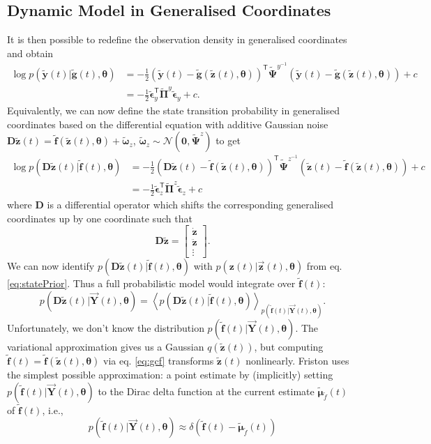 \documentclass[a4paper,10pt]{article}
\newcommand{\bs}[1]{\mathbf{#1}}					%
\newcommand{\bgs}[1]{\boldsymbol{#1}}				%
\newcommand{\tr}{\mathsf{T}}				%
\newcommand{\eq}[1]{\begin{equation} #1 \end{equation}}%
\newcommand{\gc}[1]{\tilde{#1}} %
\renewcommand{\ss}{z}         %
\newcommand{\so}{y}         %
\newcommand{\spe}{\epsilon} %
\renewcommand{\sp}{\theta}    %
\newcommand{\ps}{\bs{\ss}}    %
\newcommand{\po}{\bs{\so}}    %
\newcommand{\ppe}{\bgs{\spe}} %
\newcommand{\psg}{\gc{\ps}}    %
\newcommand{\pog}{\gc{\po}}    %
\newcommand{\ppeg}{\gc{\ppe}} %
\newcommand{\pp}{\bgs{\sp}} %
\newcommand{\Po}{\bs{Y}}    %
\newcommand{\D}{\bs{D}}				%
\newcommand{\E}[2][]{\left\langle #2 \right\rangle_{#1}}	%
\newcommand{\N}{\mathcal{N}}			%
\newcommand{\Prec}{\bgs{\Pi}}			%
\begin{document}
\subsection{Dynamic Model in Generalised Coordinates}
It is then possible to redefine the observation density in generalised coordinates and obtain
\begin{align}
    \log p(\pog(t)|\gc{\bs{g}}(t),\pp) &= -\frac{1}{2}(\pog(t) - \gc{\bs{g}}(\psg(t),\pp))^\tr\gc{\bgs{\Psi}}^{\so^{-1}}(\pog(t) - \gc{\bs{g}}(\psg(t),\pp)) + c\\
    &= -\frac{1}{2}\ppeg_\so^\tr\gc{\Prec}^{\so}\ppeg_\so + c.
\end{align}
Equivalently, we can now define the state transition probability in generalised coordinates based on the differential equation with additive Gaussian noise $\D\psg(t) = \gc{\bs{f}}(\psg(t),\pp)+\gc{\bgs{\omega}}_\ss$, $\gc{\bgs{\omega}}_\ss\sim \N(\bs{0},\gc{\bgs{\Psi}}^\ss)$ to get
\begin{align}
    \log p(\D\psg(t)|\gc{\bs{f}}(t),\pp) &= -\frac{1}{2}(\D\psg(t) - \gc{\bs{f}}(\psg(t),\pp))^\tr\gc{\bgs{\Psi}}^{\ss^{-1}}(\psg(t) - \gc{\bs{f}}(\psg(t),\pp)) + c\\
    &= -\frac{1}{2}\ppeg_\ss^\tr\gc{\Prec}^{\ss}\ppeg_\ss + c
\end{align}
where $\D$ is a differential operator which shifts the corresponding generalised coordinates up by one coordinate such that
\eq{\label{eq:derivativeOperator}
    \D\psg = \left[\begin{array}{c} \dot{\ps}\\ \ddot{\ps}\\ \vdots \end{array}\right].
}
We can now identify $p(\D\psg(t)|\gc{\bs{f}}(t),\pp)$ with $p(\ps(t)|\vec{\ps}(t),\pp)$ from eq. \eqref{eq:statePrior}. Thus a full probabilistic model would integrate over $\gc{\bs{f}}(t)$:
\eq{
    p(\D\psg(t)|\vec{\Po}(t),\pp) = \E[p(\gc{\bs{f}}(t)|\vec{\Po}(t),\pp)]{p(\D\psg(t)|\gc{\bs{f}}(t),\pp)}.
}
Unfortunately, we don't know the distribution $p(\gc{\bs{f}}(t)|\vec{\Po}(t),\pp)$. The variational approximation gives us a Gaussian $q(\psg(t))$, but computing $\gc{\bs{f}}(t) = \gc{\bs{f}}(\psg(t),\pp)$ via eq. \eqref{eq:gcf} transforms $\psg(t)$ nonlinearly. Friston uses the simplest possible approximation: a point estimate by (implicitly) setting $p(\gc{\bs{f}}(t)|\vec{\Po}(t),\pp)$ to the Dirac delta function at the current estimate $\gc{\bgs{\mu}}_{\gc{f}}(t)$ of $\gc{\bs{f}}(t)$, i.e.,
\eq{
    p(\gc{\bs{f}}(t)|\vec{\Po}(t),\pp) \approx \delta(\gc{\bs{f}}(t) - \gc{\bgs{\mu}}_{\gc{f}}(t))
}
\end{document}
